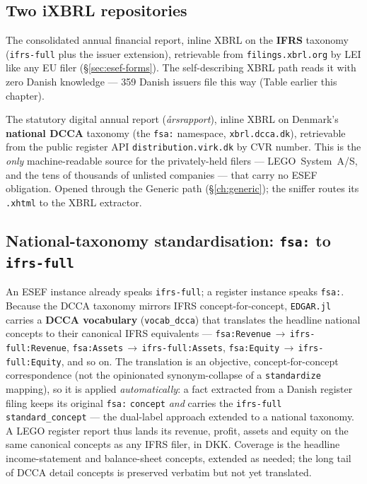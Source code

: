 \documentclass[11pt,a4paper]{report}
\begin{document}
\subsection{Two iXBRL repositories}
\label{sec:dk-repos}
\begin{description}[leftmargin=1.4em,style=nextline,itemsep=3pt]
  \item[ESEF --- listed issuers] The consolidated annual financial report, inline XBRL on the \textbf{IFRS}
    taxonomy (\texttt{ifrs-full} plus the issuer extension), retrievable from \texttt{filings.xbrl.org} by LEI
    like any EU filer (\S\ref{sec:esef-forms}). The self-describing XBRL path reads it with zero Danish
    knowledge --- 359 Danish issuers file this way (Table earlier this chapter).
  \item[Erhvervsstyrelsen --- every company] The statutory digital annual report (\emph{\aa rsrapport}),
    inline XBRL on Denmark's \textbf{national DCCA} taxonomy (the \texttt{fsa:} namespace,
    \texttt{xbrl.dcca.dk}), retrievable from the public register API \texttt{distribution.virk.dk} by CVR
    number. This is the \emph{only} machine-readable source for the privately-held filers --- LEGO~System~A/S,
    and the tens of thousands of unlisted companies --- that carry no ESEF obligation. Opened through the
    Generic path (\S\ref{ch:generic}); the sniffer routes its \texttt{.xhtml} to the XBRL extractor.
\end{description}

\subsection{National-taxonomy standardisation: \texttt{fsa:} to \texttt{ifrs-full}}
\label{sec:dk-standardisation}
An ESEF instance already speaks \texttt{ifrs-full}; a register instance speaks \texttt{fsa:}. Because the DCCA
taxonomy mirrors IFRS concept-for-concept, \texttt{EDGAR.jl} carries a \textbf{DCCA vocabulary}
(\texttt{vocab\_dcca}) that translates the headline national concepts to their canonical IFRS equivalents ---
\texttt{fsa:Revenue}\,$\to$\,\texttt{ifrs-full:Revenue}, \texttt{fsa:Assets}\,$\to$\,\texttt{ifrs-full:Assets},
\texttt{fsa:Equity}\,$\to$\,\texttt{ifrs-full:Equity}, and so on. The translation is an objective, concept-for-concept
correspondence (not the opinionated synonym-collapse of a \texttt{standardize} mapping), so it is applied
\emph{automatically}: a fact extracted from a Danish register filing keeps its original \texttt{fsa:}
\texttt{concept} \emph{and} carries the \texttt{ifrs-full} \texttt{standard\_concept} --- the dual-label approach
extended to a national taxonomy. A LEGO register report thus lands its revenue, profit, assets and equity on the
same canonical concepts as any IFRS filer, in DKK. Coverage is the headline income-statement and balance-sheet
concepts, extended as needed; the long tail of DCCA detail concepts is preserved verbatim but not yet
translated.
\end{document}
